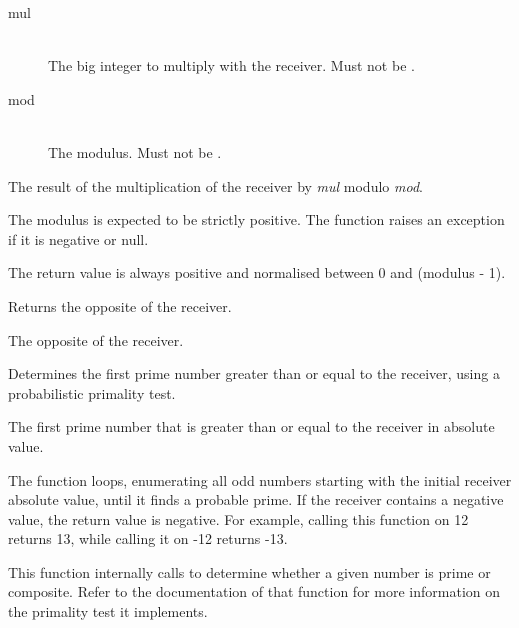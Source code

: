 
\docparams

\begin{description}
\item[mul] \hfill \\ The big integer to multiply with the receiver. Must not be .
\item[mod] \hfill \\ The modulus. Must not be .
\end{description}

\docretval

The result of the multiplication of the receiver by \emph{mul} modulo \emph{mod}.

\docdiscuss

The modulus is expected to be strictly positive. The function raises an exception if it is negative or null.

The return value is always positive and normalised between 0 and (modulus - 1).



Returns the opposite of the receiver.


\docretval

The opposite of the receiver.



Determines the first prime number greater than or equal to the receiver, using a probabilistic primality test.


\docretval

The first prime number that is greater than or equal to the receiver in absolute value.

\docdiscuss

The function loops, enumerating all odd numbers starting with the initial receiver absolute value, until it finds a probable prime. If the receiver contains a negative value, the return value is negative. For example, calling this function on 12 returns 13, while calling it on -12 returns -13.

This function internally calls  to determine whether a given number is prime or composite. Refer to the documentation of that function for more information on the primality test it implements.

